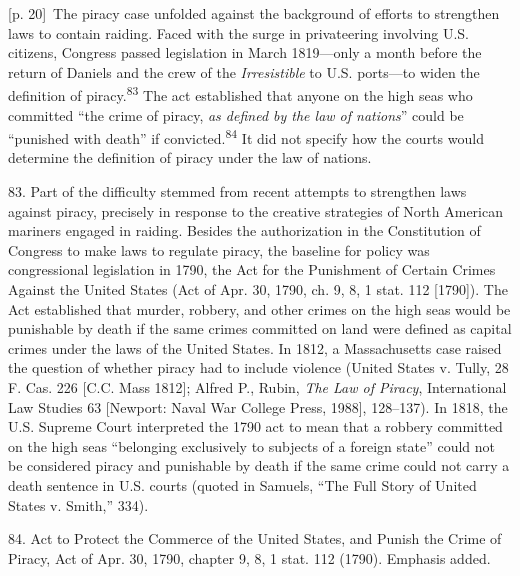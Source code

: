 \documentclass[10pt,a4paper]{article}
\begin{document}
{\scriptsize\color{gray} [p. 20]}\ The piracy case unfolded against the background of efforts to strengthen laws to contain raiding. Faced with the surge in privateering involving U.S. citizens, Congress passed legislation in March 1819—only a month before the return of Daniels and the crew of the \textit{Irresistible} to U.S. ports—to widen the definition of piracy.\nobreak\textsuperscript{83} The act established that anyone on the high seas who committed “the crime of piracy, \textit{as defined by the law of nations}” could be “punished with death” if convicted.\nobreak\textsuperscript{84} It did not specify how the courts would determine the definition of piracy under the law of nations.\par{\small 83. Part of the difficulty stemmed from recent attempts to strengthen laws against piracy, precisely in response to the creative strategies of North American mariners engaged in raiding. Besides the authorization in the Constitution of Congress to make laws to regulate piracy, the baseline for policy was congressional legislation in 1790, the Act for the Punishment of Certain Crimes Against the United States (Act of Apr. 30, 1790, ch. 9, 8, 1 stat. 112 [1790]). The Act established that murder, robbery, and other crimes on the high seas would be punishable by death if the same crimes committed on land were defined as capital crimes under the laws of the United States. In 1812, a Massachusetts case raised the question of whether piracy had to include violence (United States v. Tully, 28 F. Cas. 226 [C.C. Mass 1812]; Alfred P., Rubin, \textit{The Law of Piracy}, International Law Studies 63 [Newport: Naval War College Press, 1988], 128–137). In 1818, the U.S. Supreme Court interpreted the 1790 act to mean that a robbery committed on the high seas “belonging exclusively to subjects of a foreign state” could not be considered piracy and punishable by death if the same crime could not carry a death sentence in U.S. courts (quoted in Samuels, “The Full Story of United States v. Smith,” 334).\par}{\small 84. Act to Protect the Commerce of the United States, and Punish the Crime of Piracy, Act of Apr. 30, 1790, chapter 9, 8, 1 stat. 112 (1790). Emphasis added.\par}
\end{document}
